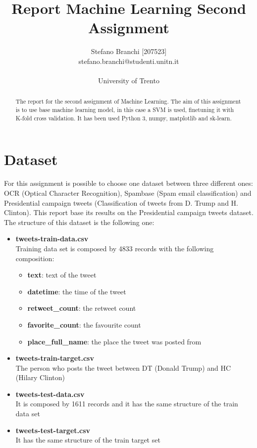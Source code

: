 \documentclass{article}
\title{Report Machine Learning Second Assignment}
\author{Stefano Branchi [207523] \\ stefano.branchi@studenti.unitn.it \\\\ University of Trento}
\date{}
\begin{document}
\maketitle
\begin{abstract}
    The report for the second assignment of Machine Learning. The aim of this assignment is to use base machine learning model, in this case a SVM is used, finetuning it with K-fold cross validation. It has been used Python 3, numpy, matplotlib and sk-learn.
\end{abstract}

\section{Dataset}
For this assignment is possible to choose one dataset between three different ones: OCR (Optical Character Recognition), Spambase (Spam email classification) and Presidential campaign tweets (Classification of tweets from D. Trump and H. Clinton). This report base its results on the Presidential campaign tweets dataset.\\
The structure of this dataset is the following one:
\begin{itemize}
  \item \textbf{tweets-train-data.csv}\\ Training data set is composed by 4833 records with the following composition:
  \begin{itemize}
      \item \textbf{text}: text of the tweet
      \item \textbf{datetime}: the time of the tweet
      \item \textbf{retweet\_count}: the retweet count
      \item \textbf{favorite\_count}: the favourite count
      \item \textbf{place\_full\_name}: the place the tweet was posted from
  \end{itemize}
  \item \textbf{tweets-train-target.csv} \\ The person who posts the tweet between DT (Donald Trump) and HC (Hilary Clinton)
  \item \textbf{tweets-test-data.csv} \\ It is composed by 1611 records and it has the same structure of the train data set
  \item \textbf{tweets-test-target.csv} \\ It has the same structure of the train target set
\end{itemize}
\end{document}

